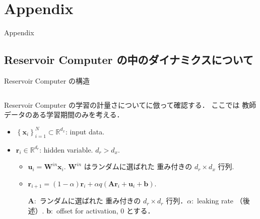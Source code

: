 \section{Appendix}

\begin{frame}
    \begin{center}
        \LARGE Appendix
    \end{center}
\end{frame}



\subsection{Reservoir Computer の中のダイナミクスについて}
\begin{frame}{Reservoir Computer の構造}
    \begin{columns}[T] %
  
        \begin{column}{.5\textwidth}
            Reservoir Computer の学習の計量さについて\cite{Bollt}に倣って確認する．
            ここでは 教師データのある学習期間のみを考える．
            \begin{itemize}
                \item $\left\{\mathbf{x}_i\right\}_{i=1}^N \subset \mathbb{R}^{d_x}$: input data.
                \item $\mathbf{r}_i \in \mathbb{R}^{d_r}$: hidden variable. $d_r>d_x$. \begin{itemize}
                    \item $\mathbf{u}_i=\mathbf{W}^{i n} \mathbf{x}_i$. $\mathbf{W}^{i n}$ はランダムに選ばれた 重み付きの $d_r \times d_x$ 行列. 
                    \item $\mathbf{r}_{i+1}=(1-\alpha) \mathbf{r}_i+\alpha q\left(\mathbf{A r}_i+\mathbf{u}_i+\mathbf{b}\right)$. 
                    
                    $\mathbf{A}:$ ランダムに選ばれた 重み付きの $d_r \times d_r$ 行列．$\alpha:$ leaking rate （後述）. $\mathbf{b}:$ offset for activation, $0$ とする．
                    

\end{itemize}
\end{itemize}
\end{column}
\end{columns}
\end{frame}
